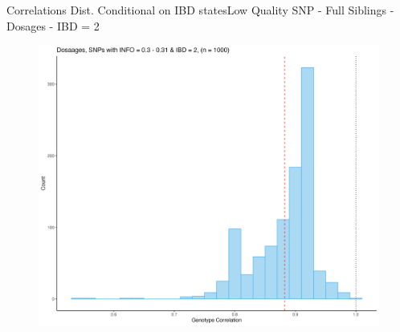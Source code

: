 \documentclass{beamer}
\begin{document}
\begin{frame}{Correlations Dist. Conditional on IBD states}{Low Quality SNP - Full Siblings - Dosages - IBD = 2}

\begin{figure}

      \includegraphics[width= .85\textwidth]{fig/DS-2-i30.png}
      
\end{figure}

\end{frame}





      





      
\end{document}
